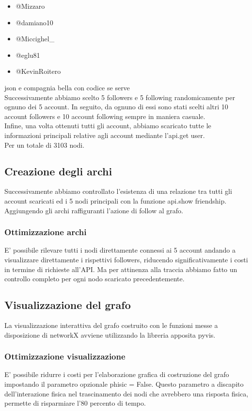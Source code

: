 \documentclass[a4paper,11pt]{report}
\begin{document}
\begin{itemize}
\item @Mizzaro
\item @damiano10
\item @Miccighel\_
\item @eglu81
\item @KevinRoitero
 \end{itemize}
json e compagnia bella con codice se serve \\
\setlength{\parindent}{0pt} 
Successivamente abbiamo scelto 5 followers e 5 following randomicamente per ognuno dei 5 account. In seguito, da ognuno di essi sono stati scelti altri 10 account followers e 10 account following sempre in maniera casuale.\\

Infine, una volta ottenuti tutti gli account, abbiamo scaricato tutte le informazioni principali relative agli account mediante l'api.get user.\\
Per un totale di 3103 nodi.
\subsection{Creazione degli archi}
Successivamente abbiamo controllato l'esistenza di una relazione tra tutti gli account scaricati ed i 5 nodi principali con la funzione api.show friendship. Aggiungendo gli archi raffiguranti l'azione di follow al grafo.
\subsubsection{Ottimizzazione archi}
E' possibile rilevare tutti i nodi direttamente connessi ai 5 account andando a visualizzare direttamente i rispettivi followers, riducendo significativamente i costi in termine di richieste all'API. Ma per attinenza alla traccia abbiamo fatto un controllo completo per ogni nodo scaricato precedentemente.

\subsection{Visualizzazione del grafo}
La visualizzazione interattiva del grafo costruito con le funzioni messe a disposizione di networkX avviene utilizzando la libreria apposita pyvis.
\subsubsection{Ottimizzazione visualizzazione}
E' possibile ridurre i costi per l'elaborazione grafica di costruzione del grafo impostando il parametro opzionale phisic = False. Questo parametro a discapito dell'interazione fisica nel trascinamento  dei nodi che avrebbero una risposta fisica, permette di risparmiare l'80 percento di tempo.
\end{document}

